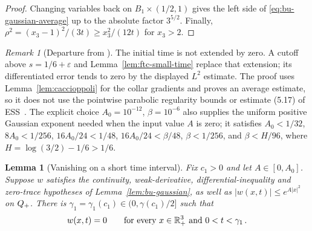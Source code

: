 \documentclass[11pt,letterpaper]{article}
\numberwithin{equation}{section}
\theoremstyle{plain}
\newtheorem{lemma}[theorem]{Lemma}
\theoremstyle{definition}
\theoremstyle{remark}
\newtheorem{remark}[theorem]{Remark}
\begin{document}
\begin{proof}
Changing variables back on $B_1\times(1/2,1)$ gives the left side of
\eqref{eq:bu-gaussian-average} up to the absolute factor $3^{5/2}$.
Finally, $\rho^2=(x_3-1)^2/(3t)\ge x_3^2/(12t)$ for $x_3>2$.
\end{proof}

\begin{remark}[Departure from \cite{ESS2003}]
The initial time is not extended by zero. A cutoff above $s=1/6+\varepsilon$
and Lemma~\ref{lem:ftc-small-time} replace that extension; its differentiated
error tends to zero by the displayed $L^2$ estimate. The proof uses
Lemma~\ref{lem:caccioppoli} for the collar gradients and proves an average
estimate, so it does not use the pointwise parabolic regularity bounds or
estimate (5.17) of ESS~\cite[§5, pp.~234--236]{ESS2003}.
The explicit choice $A_0=10^{-12}$, $\beta=10^{-6}$ also supplies the
uniform positive Gaussian exponent needed when the input value $A$ is zero;
it satisfies $A_0<1/32$, $8A_0<1/256$, $16A_0/24<1/48$,
$16A_0/24<\beta/48$, $\beta<1/256$, and $\beta<H/96$, where
$H=\log(3/2)-1/6>1/6$.
\end{remark}

\begin{lemma}[Vanishing on a short time interval]\label{lem:bu-small-time}
Fix $c_1>0$ and let $A\in[0,A_0]$. Suppose $w$ satisfies the continuity,
weak-derivative, differential-inequality and zero-trace hypotheses of
Lemma~\ref{lem:bu-gaussian}, as well as $|w(x,t)|\le e^{A|x|^2}$ on $Q_+$.
There is $\gamma_1=\gamma_1(c_1)\in(0,\gamma(c_1)/2]$ such that
\[
  w(x,t)=0\qquad\text{for every }x\in\mathbb{R}^3_+\text{ and }0<t<\gamma_1\,.
\]
\end{lemma}
\end{document}
